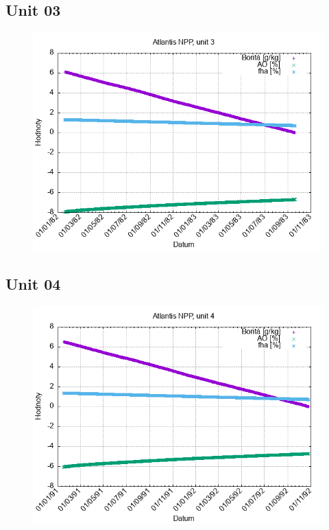 \documentclass{article}
\begin{document}
\subsection*{Unit 03}
\begin{figure}[h!]
\centering
\includegraphics[width=14cm]{./grafy/Atlantis03.png}
\end{figure}
\clearpage
\subsection*{Unit 04}
\begin{figure}[h!]
\centering
\includegraphics[width=14cm]{./grafy/Atlantis04.png}
\end{figure}
\clearpage
\end{document}
